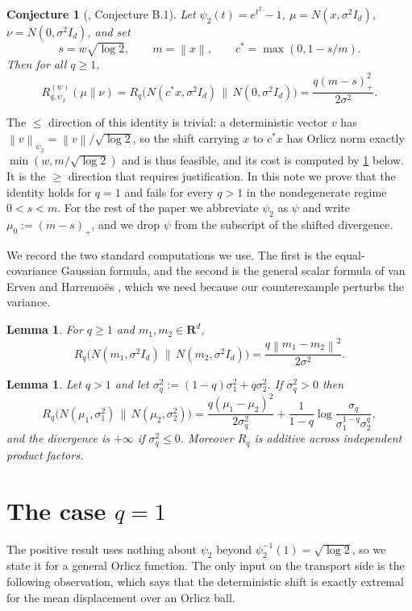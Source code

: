 \documentclass[11pt,reqno]{amsart}
\newtheorem{lemma}[theorem]{Lemma}
\newtheorem*{conjecture}{Conjecture}
\theoremstyle{definition}
\theoremstyle{remark}
\def\R{\mathbf{R}}
\newcommand{\norm}[1]{\left\lVert#1\right\rVert}
\numberwithin{equation}{section}
\begin{document}
\begin{conjecture}[\cite{altschuler2023fasterhighaccuracylogconcavesampling}, Conjecture B.1]\label{conj:main}
Let $\psi_2(t)=e^{t^2}-1$, $\mu=N(x,\sigma^2I_d)$, $\nu=N(0,\sigma^2 I_d)$, and set
$$s=w\sqrt{\log 2},\qquad m=\norm{x},\qquad c^*=\max(0,1-s/m).$$
Then for all $q\ge 1$,
$$R^{(w)}_{q,\psi_2}(\mu\|\nu)=R_q\big(N(c^*x,\sigma^2I_d)\,\big\|\,N(0,\sigma^2I_d)\big)=\frac{q(m-s)_+^2}{2\sigma^2}.$$
\end{conjecture}

The $\le$ direction of this identity is trivial: a deterministic vector $v$ has $\norm{v}_{\psi_2}=\norm{v}/\sqrt{\log 2}$, so the shift carrying $x$ to $c^*x$ has Orlicz norm exactly $\min(w,m/\sqrt{\log 2})$ and is thus feasible, and its cost is computed by \cref{lem:gauss} below. It is the $\ge$ direction that requires justification. In this note we prove that the identity holds for $q=1$ and fails for every $q>1$ in the nondegenerate regime $0<s<m$. For the rest of the paper we abbreviate $\psi_2$ as $\psi$ and write $\mu_0:=(m-s)_+$, and we drop $\psi$ from the subscript of the shifted divergence.

We record the two standard computations we use. The first is the equal-covariance Gaussian formula, and the second is the general scalar formula of van Erven and Harremo\"es \cite{van_Erven_2014}, which we need because our counterexample perturbs the variance.

\begin{lemma}\label{lem:gauss}
For $q\ge 1$ and $m_1,m_2\in\R^d$,
$$R_q\big(N(m_1,\sigma^2I_d)\,\big\|\,N(m_2,\sigma^2I_d)\big)=\frac{q\norm{m_1-m_2}^2}{2\sigma^2}.$$
\end{lemma}

\begin{lemma}\label{lem:veh}
Let $q>1$ and let $\sigma_q^2:=(1-q)\sigma_1^2+q\sigma_2^2$. If $\sigma_q^2>0$ then
$$R_q\big(N(\mu_1,\sigma_1^2)\,\big\|\,N(\mu_2,\sigma_2^2)\big)=\frac{q(\mu_1-\mu_2)^2}{2\sigma_q^2}+\frac{1}{1-q}\log\frac{\sigma_q}{\sigma_1^{1-q}\sigma_2^{q}},$$
and the divergence is $+\infty$ if $\sigma_q^2\le 0$. Moreover $R_q$ is additive across independent product factors.
\end{lemma}

\section{The case \texorpdfstring{$q=1$}{q=1}}

The positive result uses nothing about $\psi_2$ beyond $\psi_2^{-1}(1)=\sqrt{\log 2}$, so we state it for a general Orlicz function. The only input on the transport side is the following observation, which says that the deterministic shift is exactly extremal for the mean displacement over an Orlicz ball.
\end{document}
